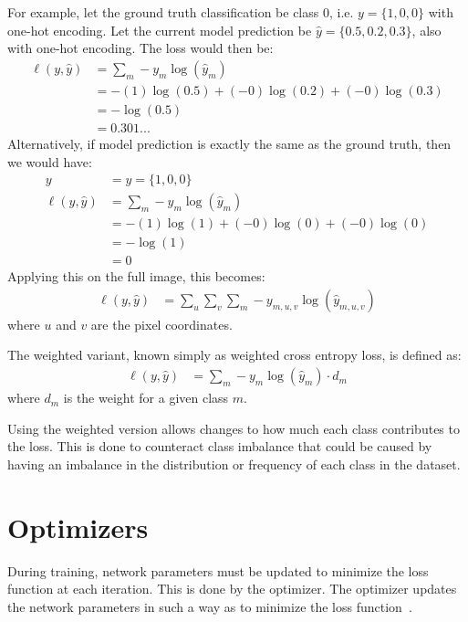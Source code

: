 For example, let the ground truth classification be class 0, i.e. $y = \{1, 0, 0\}$ with one-hot encoding.
Let the current model prediction be $\hat{y} = \{0.5, 0.2, 0.3\}$, also with one-hot encoding.
The loss would then be:
\begin{equation}
	\begin{split}
		\ell(y, \hat{y}) 	&= \sum_{m}-y_m \log(\hat{y}_m) \\
		&= -(1)\log(0.5) + (-0)\log(0.2) + (-0)\log(0.3)\\
		&= -\log(0.5) \\
		&= 0.301...
	\end{split}
\end{equation}
Alternatively, if model prediction is exactly the same as the ground truth, then we would have:
\begin{equation}
	\begin{split}
		y					&= \hat{y} = \{1, 0, 0\}\\
		\ell(y, \hat{y}) 	&= \sum_{m}-y_m \log(\hat{y}_m) \\
		&= -(1)\log(1) + (-0)\log(0) + (-0)\log(0)\\
		&= -\log(1) \\
		&= 0
	\end{split}
\end{equation}
Applying this on the full image, this becomes:
\begin{align}
	\ell(y, \hat{y}) &=\sum_u \sum_v \sum_{m}-y_{m, u, v}\log(\hat{y}_{m,u,v})
\end{align}
where $u$ and $v$ are the pixel coordinates.

The weighted variant, known simply as weighted cross entropy loss, is defined as:
\begin{align}
	\ell(y, \hat{y}) &=\sum_{m}-y_m\log(\hat{y}_m) \cdot d_m
\end{align}
where $d_m$ is the weight for a given class $m$.

Using the weighted version allows changes to how much each class contributes to the loss.
This is done to counteract class imbalance that could be caused by having an imbalance in the distribution or frequency of each class in the dataset.

\section{Optimizers}\label{section:background-optimizers}
During training, network parameters must be updated to minimize the loss function at each iteration.
This is done by the optimizer.
The optimizer updates the network parameters in such a way as to minimize the loss function~\cite{optimizer-intro}.


